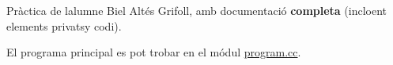 Pràctica de l\textquotesingle{}alumne Biel Altés Grifoll, amb documentació {\bfseries{ completa}} (incloent elements privatsy codi).

El programa principal es pot trobar en el módul \mbox{\hyperlink{program_8cc}{program.\+cc}}. 